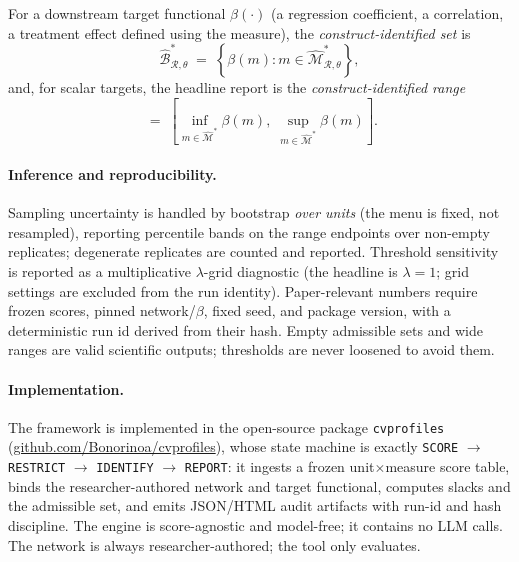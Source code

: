 \documentclass[11pt,letterpaper]{article}
\newcommand{\cvp}{\texttt{cvprofiles}}
\begin{document}
For a downstream target functional $\beta(\cdot)$ (a regression coefficient, a correlation, a treatment effect defined using the measure), the \emph{construct-identified set} is
\begin{equation}
  \widehat{\mathcal{B}}^{*}_{\mathcal{R},\theta} \;=\; \left\{ \beta(m) : m \in \widehat{\mathcal{M}}^{*}_{\mathcal{R},\theta} \right\},
  \label{eq:bset}
\end{equation}
and, for scalar targets, the headline report is the \emph{construct-identified range}
\begin{equation}
  [\widehat{L}, \widehat{U}] \;=\; \left[ \inf_{m \in \widehat{\mathcal{M}}^{*}} \beta(m),\; \sup_{m \in \widehat{\mathcal{M}}^{*}} \beta(m) \right].
  \label{eq:range}
\end{equation}

\paragraph{Inference and reproducibility.}
Sampling uncertainty is handled by bootstrap \emph{over units} (the menu is fixed, not resampled), reporting percentile bands on the range endpoints over non-empty replicates; degenerate replicates are counted and reported. Threshold sensitivity is reported as a multiplicative $\lambda$-grid diagnostic (the headline is $\lambda=1$; grid settings are excluded from the run identity). Paper-relevant numbers require frozen scores, pinned network/$\beta$, fixed seed, and package version, with a deterministic run id derived from their hash. Empty admissible sets and wide ranges are valid scientific outputs; thresholds are never loosened to avoid them.

\paragraph{Implementation.}
The framework is implemented in the open-source package \cvp{} \cite{cvprofiles} (\url{github.com/Bonorinoa/cvprofiles}), whose state machine is exactly \texttt{SCORE} $\rightarrow$ \texttt{RESTRICT} $\rightarrow$ \texttt{IDENTIFY} $\rightarrow$ \texttt{REPORT}: it ingests a frozen unit$\times$measure score table, binds the researcher-authored network and target functional, computes slacks and the admissible set, and emits JSON/HTML audit artifacts with run-id and hash discipline. The engine is score-agnostic and model-free; it contains no LLM calls. The network is always researcher-authored; the tool only evaluates.
\end{document}
